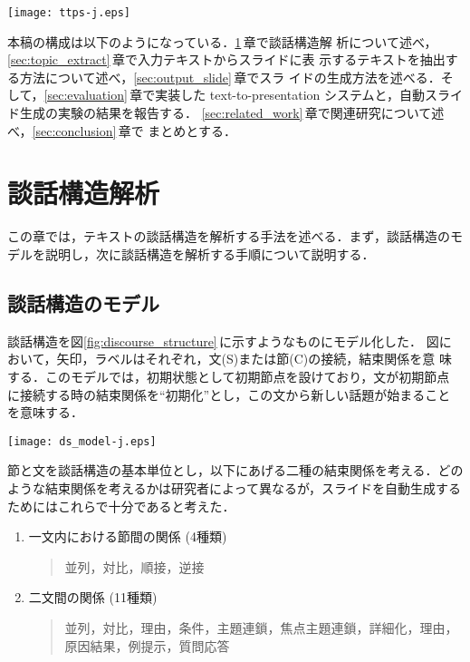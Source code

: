 \begin{figure*}[t]
 \begin{center}
    \texttt{[image: ttps-j.eps]}
\caption{text-to-presentationシステム}
\label{fig:presentation_system}
 \end{center} 

\end{figure*}

本稿の構成は以下のようになっている．\ref{sec:ds_analysis}\,章で談話構造解
析について述べ，\ref{sec:topic_extract}\,章で入力テキストからスライドに表
示するテキストを抽出する方法について述べ，\ref{sec:output_slide}\,章でスラ
イドの生成方法を述べる．そして，\ref{sec:evaluation}\,章で実装した
text-to-presentation システムと，自動スライド生成の実験の結果を報告する．
\ref{sec:related_work}\,章で関連研究について述べ，\ref{sec:conclusion}\,章で
まとめとする．

\section{談話構造解析}
\label{sec:ds_analysis}

この章では，テキストの談話構造を解析する手法を述べる．まず，談話構造のモ
デルを説明し，次に談話構造を解析する手順について説明する．
\subsection{談話構造のモデル}
\label{subsec:ds_model}

談話構造を図\ref{fig:discourse_structure}\,に示すようなものにモデル化した．
図において，矢印，ラベルはそれぞれ，文(S)または節(C)の接続，結束関係を意
味する．このモデルでは，初期状態として初期節点を設けており，文が初期節点
に接続する時の結束関係を``初期化''とし，この文から新しい話題が始まること
を意味する．

\begin{figure*}[t]
 \begin{center}
     \texttt{[image: ds\_model-j.eps]}
\caption{談話構造のモデル}
\label{fig:discourse_structure}
 \end{center} 
\end{figure*}

節と文を談話構造の基本単位とし，以下にあげる二種の結束関係を考える．どの
ような結束関係を考えるかは研究者によって異なるが，スライドを自動生成する
ためにはこれらで十分であると考えた．

\begin{enumerate}
 \item 一文内における節間の関係 (4種類)

 \begin{quote}
   並列，対比，順接，逆接
 \end{quote}

 \item 二文間の関係 (11種類)
 \begin{quote}
並列，対比，理由，条件，主題連鎖，焦点主題連鎖，詳細化，理由，原因結果，例提示，質問応答  
\end{quote}
\end{enumerate}


